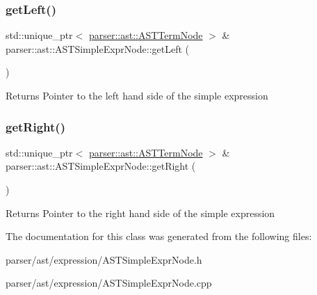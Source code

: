 \subsubsection{\texorpdfstring{get\+Left()}{getLeft()}}
{\footnotesize\ttfamily std\+::unique\+\_\+ptr$<$ \hyperlink{classparser_1_1ast_1_1ASTTermNode}{parser\+::ast\+::\+A\+S\+T\+Term\+Node} $>$ \& parser\+::ast\+::\+A\+S\+T\+Simple\+Expr\+Node\+::get\+Left (\begin{DoxyParamCaption}{ }\end{DoxyParamCaption})}

\begin{DoxyReturn}{Returns}
Pointer to the left hand side of the simple expression 
\end{DoxyReturn}
\mbox{\label{classparser_1_1ast_1_1ASTSimpleExprNode_a08c175910e5c8ed18462c9919ff08343}} 
\subsubsection{\texorpdfstring{get\+Right()}{getRight()}}
{\footnotesize\ttfamily std\+::unique\+\_\+ptr$<$ \hyperlink{classparser_1_1ast_1_1ASTTermNode}{parser\+::ast\+::\+A\+S\+T\+Term\+Node} $>$ \& parser\+::ast\+::\+A\+S\+T\+Simple\+Expr\+Node\+::get\+Right (\begin{DoxyParamCaption}{ }\end{DoxyParamCaption})}

\begin{DoxyReturn}{Returns}
Pointer to the right hand side of the simple expression 
\end{DoxyReturn}


The documentation for this class was generated from the following files\+:\begin{DoxyCompactItemize}
\item 
parser/ast/expression/A\+S\+T\+Simple\+Expr\+Node.\+h\item 
parser/ast/expression/A\+S\+T\+Simple\+Expr\+Node.\+cpp\end{DoxyCompactItemize}

